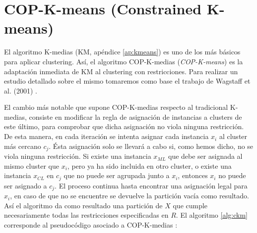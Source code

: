 \section{COP-K-means (Constrained K-means)} \label{copkm}

El algoritmo K-medias (\acs{KM}, apéndice \ref{ap:kmeans}) es uno de los más básicos para aplicar clustering. Así, el algoritmo COP-K-medias (\textit{COP-K-means}) es la adaptación inmediata de \acs{KM} al clustering con restricciones. Para realizar un estudio detallado sobre el mismo tomaremos como base el trabajo de Wagstaff et al. (2001) \cite{Wagstaff:2001b}.

El cambio más notable que supone COP-K-medias respecto al tradicional K-medias, consiste en modificar la regla de asignación de instancias a clusters de este último, para comprobar que dicha asignación no viola ninguna restricción. De esta manera, en cada iteración se intenta asignar cada instancia $x_i$ al cluster más cercano $c_j$. Ésta asignación solo se llevará a cabo si, como hemos dicho, no se viola ninguna restricción. Si existe una instancia $x_{ML}$ que debe ser asignada al mismo cluster que $x_i$, pero ya ha sido incluida en otro cluster, o existe una instancia $x_{CL}$ en $c_j$ que no puede ser agrupada junto a $x_i$, entonces $x_i$ no puede ser asignado a $c_j$. El proceso continua hasta encontrar una asignación legal para $x_i$, en caso de que no se encuentre se devuelve la partición vacía como resultado. Así el algoritmo da como resultado una partición de $X$ que cumple necesariamente todas las restricciones especificadas en $R$. El algoritmo \ref{alg:ckm} corresponde al pseudocódigo asociado a COP-K-medias \cite{Wagstaff:2001b}:


